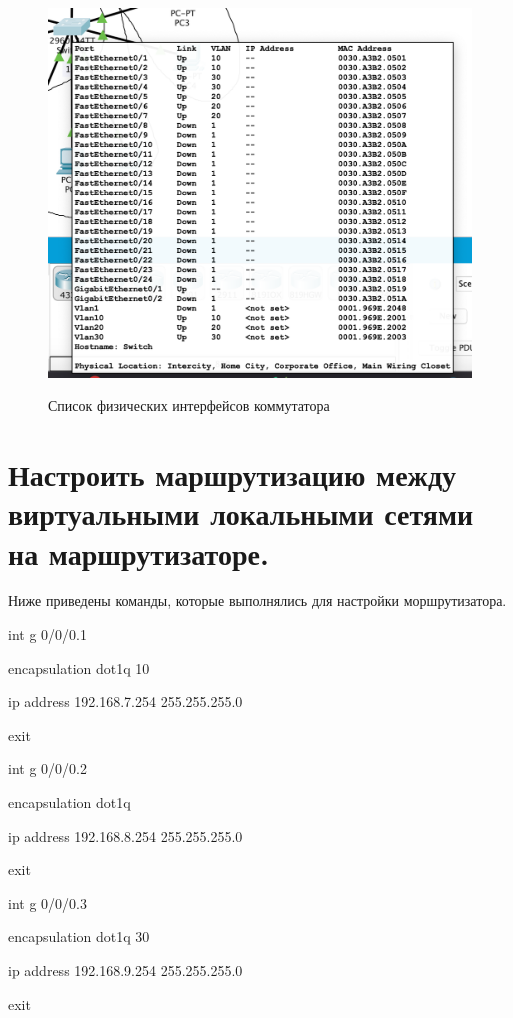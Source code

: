 \documentclass[a4paper,12pt]{article}
\begin{document}
	\begin{figure}[h!]
		\begin{center}
			{\includegraphics[scale = 0.6]{img/3.png}}
			\caption{Список физических интерфейсов коммутатора}
			\label{ris:3}
		\end{center}
	\end{figure}	

	\section{Настроить маршрутизацию между виртуальными локальными сетями на маршрутизаторе.}

	Ниже приведены команды, которые выполнялись для настройки моршрутизатора.

	int g 0/0/0.1
	
	encapsulation dot1q 10
	
	ip address 192.168.7.254 255.255.255.0
	
	exit
	
	int g 0/0/0.2
	
	encapsulation dot1q 
	
	ip address 192.168.8.254 255.255.255.0
	
	exit
	
	int g 0/0/0.3
	
	encapsulation dot1q 30
	
	ip address 192.168.9.254 255.255.255.0
	
	exit
	
\end{document}

